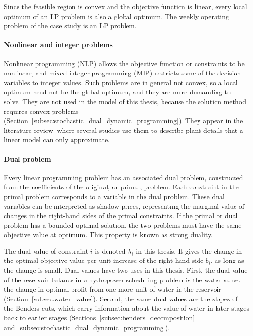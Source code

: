 Since the feasible region is convex and the objective function is linear, every local optimum of an LP problem is also a global optimum. %
The weekly operating problem of the case study is an LP problem.

\paragraph{Nonlinear and integer problems}

Nonlinear programming (NLP) allows the objective function
or constraints to be nonlinear, and mixed-integer programming (MIP)
restricts some of the decision variables to integer values. Such
problems are in general not convex, so a local optimum need not be the
global optimum, and they are more demanding to solve. They are not used
in the model of this thesis, because the solution method requires
convex problems
(Section~\ref{subsec:stochastic_dual_dynamic_programming}). They appear
in the literature review, where several studies use them to describe
plant details that a linear model can only approximate.

\paragraph{Dual problem}

Every linear programming problem has an associated dual
problem, constructed from the coefficients of the original,
or primal, problem. Each constraint in the primal problem
corresponds to a variable in the dual problem. These
dual variables can be interpreted as shadow prices,
representing the marginal value of changes in the
right-hand sides of the primal constraints. If the primal or dual problem has a bounded optimal solution, the two problems must have the same objective value
at optimum. This property
is known as strong duality.

The dual value of constraint $i$ is denoted $\lambda_i$ in this thesis. It gives the change in the optimal objective value per unit increase of the right-hand side $b_i$, as long as the change is small. Dual values have two uses in this thesis. First, the dual value of the reservoir balance in a hydropower scheduling problem is the water value: the change in optimal profit from one more unit of water in the reservoir (Section~\ref{subsec:water_value}). Second, the same dual values are the slopes of the Benders cuts, which carry information about the value of water in later stages back to earlier stages (Sections~\ref{subsec:benders_decomposition} and~\ref{subsec:stochastic_dual_dynamic_programming}).

